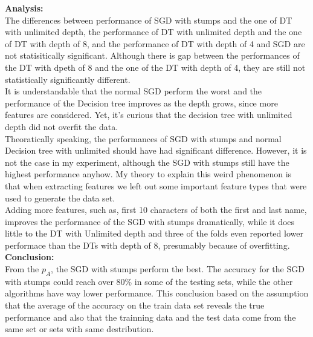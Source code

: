 \begin{enumerate}
		\textbf{Analysis:}\\
		The differences between performance of SGD with stumps and the one of DT with unlimited depth, the performance of DT with unlimited depth and the one of DT with depth of 8, and the performance of DT with depth of 4 and SGD are not statisitically significant. Although there is gap between the performances of the DT with dpeth of 8 and the one of the DT with depth of 4, they are still not statistically significantly different.\\
		It is understandable that the normal SGD perform the worst and the performance of the Decision tree improves as the depth grows, since more features are considered. Yet, it's curious that the decision tree with unlimited depth did not overfit the data.\\
		Theoratically speaking, the performances of SGD with stumps and normal Decision tree with unlimited should have had significant difference. However, it is not the case in my experiment, although the SGD with stumps still have the highest performance anyhow. My theory to explain this weird phenomenon is that when extracting features we left out some important feature types that were used to generate the data set.\\
		Adding more features, such as, first 10 characters of both the first and last name, improves the performance of the SGD with stumps dramatically, while it does little to the DT with Unlimited depth and three of the folds even reported lower performace than the DTs with depth of 8, presumably because of overfitting.
		\\

		\textbf{Conclusion:}\\
		From the \(p_A\), the SGD with stumps perform the best. The accuracy for the SGD with stumps could reach over 80\% in some of the testing sets, while the other algorithms have way lower performance. This conclusion based on the assumption that the average of the accuracy on the train data set reveals the true performance and also that the trainning data and the test data come from the same set or sets with same destribution.\\



\end{enumerate}
